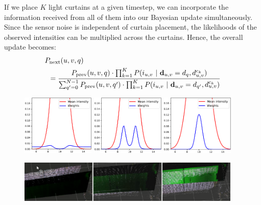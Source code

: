 If we place $K$ light curtains at a given timestep, we can incorporate the information received from all of them into our Bayesian update simultaneously. Since the sensor noise is independent of curtain placement, the likelihoods of the observed intensities can be multiplied across the curtains. Hence, the overall update becomes: 
\begin{align*}
   &\after{q} \\
   &\hspace{5pt}= \frac{\before{q} \cdot \prod_{k=1}^K P(i_{u, v}\ |\ \dd_{u, v} = d_q, d^{c_k}_{u, v})}{\sum_{\qb=0}^{N-1} \before{\qb} \cdot \prod_{k=1}^K P(i_{u, v}\ |\ \dd_{u, v} = d_{\qb}, d^{c_k}_{u, v})}
\end{align*} 

\begin{figure}[h]
   \centering
   \begin{minipage}{0.5\textwidth}
       \centering
       \includegraphics[width=0.31\textwidth]{figures/aa.pdf}
       \includegraphics[width=0.31\textwidth]{figures/bb.pdf}
       \includegraphics[width=0.31\textwidth]{figures/cc.pdf}
   \end{minipage}\hfill
   \begin{minipage}{0.5\textwidth}
      \centering
      \includegraphics[width=0.95\textwidth]{figures/planesweep2.png}

\end{minipage}
\end{figure}
